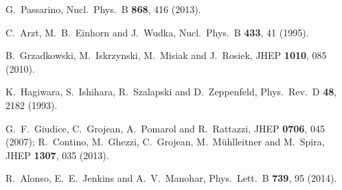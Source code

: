   G.~Passarino,
  Nucl.\ Phys.\ B {\bf 868}, 416 (2013).
  
  C.~Arzt, M.~B.~Einhorn and J.~Wudka,
  Nucl.\ Phys.\ B {\bf 433}, 41 (1995).

  B.~Grzadkowski, M.~Iskrzynski, M.~Misiak and J.~Rosiek,
  JHEP {\bf 1010}, 085 (2010).

  K.~Hagiwara, S.~Ishihara, R.~Szalapski and D.~Zeppenfeld,
  Phys.\ Rev.\ D {\bf 48}, 2182 (1993).
  
  G.~F.~Giudice, C.~Grojean, A.~Pomarol and R.~Rattazzi,
  JHEP {\bf 0706}, 045 (2007);
  R.~Contino, M.~Ghezzi, C.~Grojean, M.~M\"uhlleitner and M.~Spira,
  JHEP {\bf 1307}, 035 (2013).
  
  R.~Alonso, E.~E.~Jenkins and A.~V.~Manohar,
  Phys.\ Lett.\ B {\bf 739}, 95 (2014).
  

